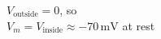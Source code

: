\documentclass[preview]{standalone}
\begin{document}
\begin{center}
$V_{\mathrm{outside}} = 0$, so\\$V_m = V_{\mathrm{inside}} \approx -70\,\mathrm{mV}$ at rest
\end{center}
\end{document}
